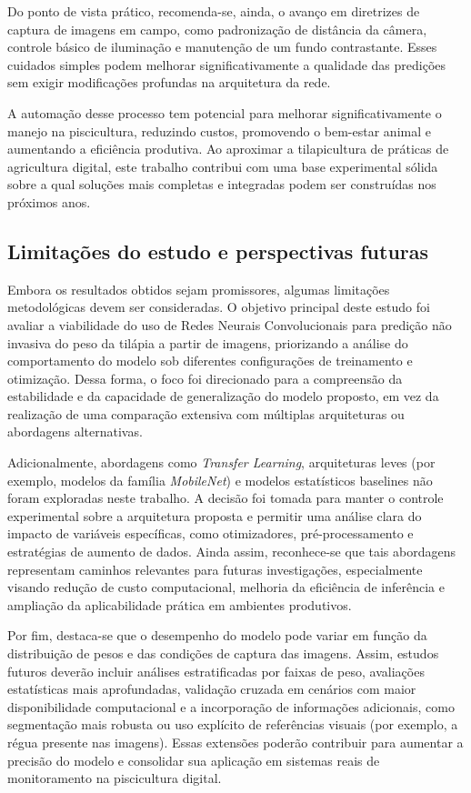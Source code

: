 \documentclass[sigconf,nonacm,screen]{acmart}
\begin{document}
Do ponto de vista prático, recomenda-se, ainda, o avanço em diretrizes de captura de imagens em campo, como padronização de distância da câmera, controle básico de iluminação e manutenção de um fundo contrastante. Esses cuidados simples podem melhorar significativamente a qualidade das predições sem exigir modificações profundas na arquitetura da rede.

A automação desse processo tem potencial para melhorar significativamente o manejo na piscicultura, reduzindo custos, promovendo o bem-estar animal e aumentando a eficiência produtiva. Ao aproximar a tilapicultura de práticas de agricultura digital, este trabalho contribui com uma base experimental sólida sobre a qual soluções mais completas e integradas podem ser construídas nos próximos anos.

\subsection{Limitações do estudo e perspectivas futuras}

Embora os resultados obtidos sejam promissores, algumas limitações metodológicas devem ser consideradas. O objetivo principal deste estudo foi avaliar a viabilidade do uso de Redes Neurais Convolucionais para predição não invasiva do peso da tilápia a partir de imagens, priorizando a análise do comportamento do modelo sob diferentes configurações de treinamento e otimização. Dessa forma, o foco foi direcionado para a compreensão da estabilidade e da capacidade de generalização do modelo proposto, em vez da realização de uma comparação extensiva com múltiplas arquiteturas ou abordagens alternativas.

Adicionalmente, abordagens como \textit{Transfer Learning}, arquiteturas leves (por exemplo, modelos da família \textit{MobileNet}) e modelos estatísticos baselines não foram exploradas neste trabalho. A decisão foi tomada para manter o controle experimental sobre a arquitetura proposta e permitir uma análise clara do impacto de variáveis específicas, como otimizadores, pré-processamento e estratégias de aumento de dados. Ainda assim, reconhece-se que tais abordagens representam caminhos relevantes para futuras investigações, especialmente visando redução de custo computacional, melhoria da eficiência de inferência e ampliação da aplicabilidade prática em ambientes produtivos.

Por fim, destaca-se que o desempenho do modelo pode variar em função da distribuição de pesos e das condições de captura das imagens. Assim, estudos futuros deverão incluir análises estratificadas por faixas de peso, avaliações estatísticas mais aprofundadas, validação cruzada em cenários com maior disponibilidade computacional e a incorporação de informações adicionais, como segmentação mais robusta ou uso explícito de referências visuais (por exemplo, a régua presente nas imagens). Essas extensões poderão contribuir para aumentar a precisão do modelo e consolidar sua aplicação em sistemas reais de monitoramento na piscicultura digital.
\end{document}
